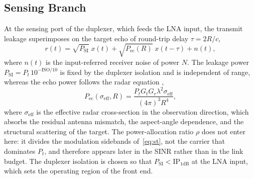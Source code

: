 \documentclass[10pt,journal,comsoc]{IEEEtran}
\begin{document}
\subsection{Sensing Branch}
\label{sec:sens_branch}

At the sensing port of the duplexer, which feeds the LNA input, the transmit
leakage superimposes on the target echo of round-trip delay
$\tau=2R/c$,
\begin{equation}
r(t)=\sqrt{P_{\mathrm{SI}}}\;x(t)+\sqrt{P_{\mathrm{ec}}(R)}\;x(t-\tau)
+n(t),
\label{eq:rt}
\end{equation}
where $n(t)$ is the input-referred receiver noise of power $N$.
The leakage power $P_{\mathrm{SI}}=P_t\,10^{-\mathrm{ISO}/10}$ is fixed
by the duplexer isolation and is independent of range, whereas the echo
power follows the radar equation \cite{sturm_waveform_2011},
\begin{equation}
P_{\mathrm{ec}}(\sigma_{\mathrm{eff}},R)
=\frac{P_tG_tG_r\lambda^2\sigma_{\mathrm{eff}}}{(4\pi)^3R^4},
\label{eq:pec}
\end{equation}
where $\sigma_{\mathrm{eff}}$ is the effective radar cross-section in
the observation direction, which absorbs the residual antenna mismatch,
the aspect-angle dependence, and the structural scattering of the
target. The power-allocation ratio $\rho$ does not enter here: it
divides the modulation sidebands of~\eqref{eq:st}, not the carrier that
dominates $P_t$, and therefore appears later in the SINR rather than in
the link budget. The duplexer isolation is chosen so that
$P_{\mathrm{SI}}<\mathrm{IP}_{1\mathrm{dB}}$ at the LNA input, which
sets the operating region of the front end.
\end{document}
